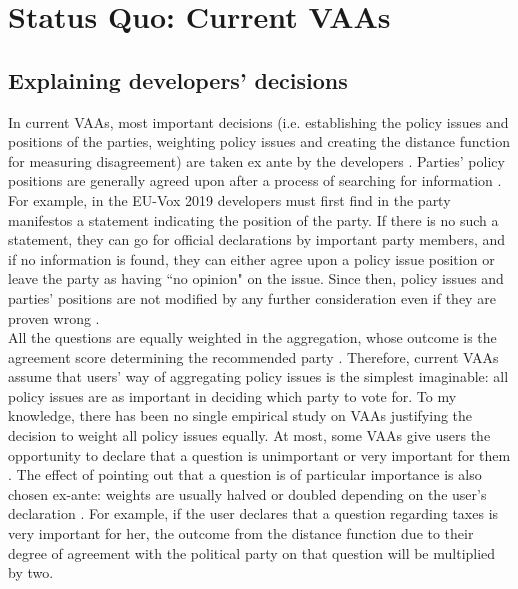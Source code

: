 \documentclass{scrartcl}
\begin{document}
\section{Status Quo: Current VAAs}
 
\subsection{Explaining developers' decisions}

In current VAAs, most important decisions (i.e. establishing the policy issues and positions of the parties, weighting policy issues and creating the distance function for measuring disagreement) are taken ex ante by the developers \cite{louwerse2014design}. Parties' policy positions are generally agreed upon after a process of searching for information \cite{wagner2012matching}. For example, in the EU-Vox 2019 developers must first find in the party manifestos a statement indicating the position of the party. If there is no such a statement, they can go for official declarations by important party members, and if no information is found, they can either agree upon a policy issue position or leave the party as having ``no opinion" on the issue. Since then, policy issues and parties' positions are not modified by any further consideration even if they are proven wrong \cite{Mendez2017}. 
\\

All the questions are equally weighted in the aggregation, whose outcome is the agreement score determining the recommended party \cite{Mendez2012}. Therefore, current VAAs assume that users' way of aggregating policy issues is the simplest imaginable: all  policy issues are as important in deciding which party to vote for. To my knowledge, there has been no single empirical study on VAAs justifying the decision to weight all policy issues equally. At most, some VAAs give users the opportunity to declare that a question is unimportant or very important for them \cite{louwerse2014design}. The effect of pointing out that a question is of particular importance is also chosen ex-ante: weights are usually halved or doubled depending on the user's declaration \cite{wagner2012matching}. For example, if the user declares that a question regarding taxes is very important for her, the outcome from the distance function due to their degree of agreement with the political party on that question will be multiplied by two. 
\\
\end{document}
